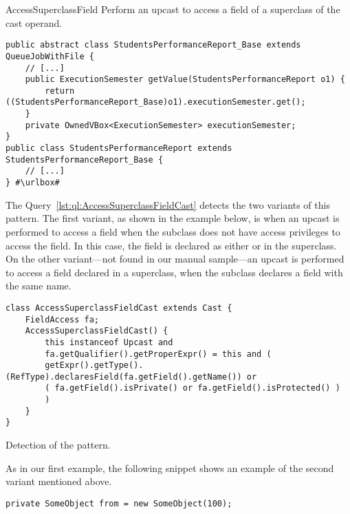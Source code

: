 \begin{pattern}{AccessSuperclassField}
Perform an upcast to access a field of a superclass of the cast operand.

\instances{}

\def\urlvar{http://bit.ly/FenixEdu_fenixedu_academic_2SQxlkC}
\begin{verbatim}
public abstract class StudentsPerformanceReport_Base extends QueueJobWithFile {
    // [...]
    public ExecutionSemester getValue(StudentsPerformanceReport o1) {
        return ((StudentsPerformanceReport_Base)o1).executionSemester.get();
    }
    private OwnedVBox<ExecutionSemester> executionSemester;
}
public class StudentsPerformanceReport extends StudentsPerformanceReport_Base {
    // [...]
} #\urlbox#
\end{verbatim}


\detection{}
The Query~\ref{lst:ql:AccessSuperclassFieldCast} detects the two variants of this pattern.
The first variant, as shown in the example below, is when an upcast is performed to access a field when the subclass does not have access privileges to access the field.
In this case, the field is declared as either  or  in the superclass.
On the other variant---not found in our manual sample---an upcast is performed to access a field declared in a superclass,
when the subclass declares a field with the same name.


\begin{listing}
\begin{verbatim}
class AccessSuperclassFieldCast extends Cast {
	FieldAccess fa;
	AccessSuperclassFieldCast() {
		this instanceof Upcast and
		fa.getQualifier().getProperExpr() = this and (
		getExpr().getType().(RefType).declaresField(fa.getField().getName()) or
		( fa.getField().isPrivate() or fa.getField().isProtected() )
		)
	}
}
\end{verbatim}
\caption{Detection of the \thisp{} pattern.}
\label{lst:ql:AccessSuperclassFieldCast}
\end{listing}

As in our first example,
the following snippet shows an example of the second variant mentioned above.

\def\urlvar{http://bit.ly/mockito_mockito_2vF51Em}
\begin{listing}
\begin{verbatim}
private SomeObject from = new SomeObject(100);


\end{verbatim}
\end{listing}
\end{pattern}
